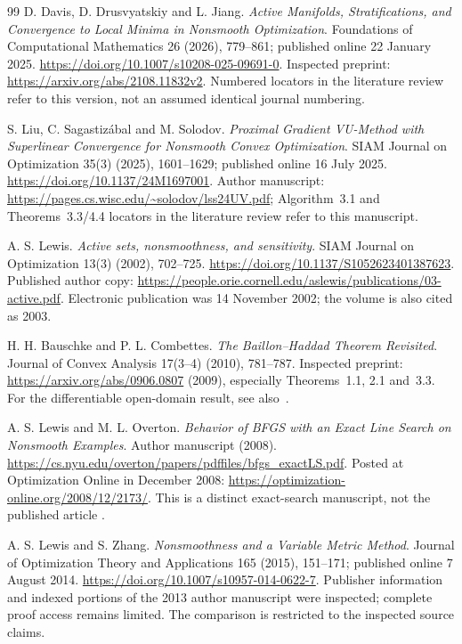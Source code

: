 \begin{thebibliography}{99}
D. Davis, D. Drusvyatskiy and L. Jiang. \emph{Active Manifolds, Stratifications, and Convergence to Local Minima in Nonsmooth Optimization}. Foundations of Computational Mathematics 26 (2026), 779--861; published online 22 January 2025. \url{https://doi.org/10.1007/s10208-025-09691-0}. Inspected preprint: \url{https://arxiv.org/abs/2108.11832v2}. Numbered locators in the literature review refer to this version, not an assumed identical journal numbering.

S. Liu, C. Sagastiz\'abal and M. Solodov. \emph{Proximal Gradient VU-Method with Superlinear Convergence for Nonsmooth Convex Optimization}. SIAM Journal on Optimization 35(3) (2025), 1601--1629; published online 16 July 2025. \url{https://doi.org/10.1137/24M1697001}. Author manuscript: \url{https://pages.cs.wisc.edu/~solodov/lss24UV.pdf}; Algorithm~3.1 and Theorems~3.3/4.4 locators in the literature review refer to this manuscript.

A. S. Lewis. \emph{Active sets, nonsmoothness, and sensitivity}. SIAM Journal on Optimization 13(3) (2002), 702--725. \url{https://doi.org/10.1137/S1052623401387623}. Published author copy: \url{https://people.orie.cornell.edu/aslewis/publications/03-active.pdf}. Electronic publication was 14 November 2002; the volume is also cited as 2003.

H. H. Bauschke and P. L. Combettes. \emph{The Baillon--Haddad Theorem Revisited}. Journal of Convex Analysis 17(3--4) (2010), 781--787. Inspected preprint: \url{https://arxiv.org/abs/0906.0807} (2009), especially Theorems~1.1, 2.1 and~3.3. For the differentiable open-domain result, see also~\cite{WW}.

A. S. Lewis and M. L. Overton. \emph{Behavior of BFGS with an Exact Line Search on Nonsmooth Examples}. Author manuscript (2008). \url{https://cs.nyu.edu/overton/papers/pdffiles/bfgs_exactLS.pdf}. Posted at Optimization Online in December 2008: \url{https://optimization-online.org/2008/12/2173/}. This is a distinct exact-search manuscript, not the published article \cite{LO}.

A. S. Lewis and S. Zhang. \emph{Nonsmoothness and a Variable Metric Method}. Journal of Optimization Theory and Applications 165 (2015), 151--171; published online 7 August 2014. \url{https://doi.org/10.1007/s10957-014-0622-7}. Publisher information and indexed portions of the 2013 author manuscript were inspected; complete proof access remains limited. The comparison is restricted to the inspected source claims.


\end{thebibliography}
